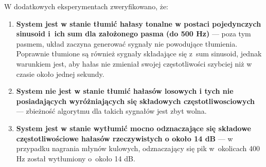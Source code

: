 W dodatkowych eksperymentach zweryfikowano, że:
\begin{enumerate}
    \item \textbf{System jest w stanie tłumić hałasy tonalne w postaci
    pojedynczych sinusoid i~ich sum dla założonego pasma (do 500 Hz)} --- poza
    tym pasmem, układ zaczyna generować sygnały nie powodujące tłumienia.
    Poprawnie tłumione są również sygnały składające się z~sum sinusoid, jednak
    warunkiem jest, aby hałas nie zmieniał swojej częstotliwości szybciej niż w
    czasie około jednej sekundy.
    \item \textbf{System nie jest w stanie tłumić hałasów losowych i tych nie
    posiadających wyróżniających się składowych częstotliwosciowych} ---
    zbieżność algorytmu dla takich sygnałów jest zbyt wolna.
    \item \textbf{System jest w stanie wytłumić mocno odznaczające się składowe
    częstotliwościowe hałasów rzeczywistych o około 14 dB} --- w przypadku
    nagrania młynów kulowych, odznaczający się pik w~okolicach 400 Hz został
    wytłumiony o~około 14 dB.
\end{enumerate}
